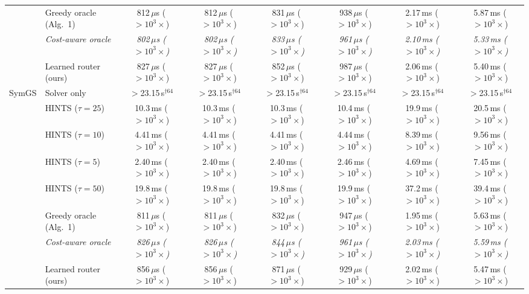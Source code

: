 {\begin{tabular}{llcccccc}
 & Greedy oracle (Alg.~1) & 812\,$\mu$s ($>10^{3}\times$) & 812\,$\mu$s ($>10^{3}\times$) & 831\,$\mu$s ($>10^{3}\times$) & 938\,$\mu$s ($>10^{3}\times$) & 2.17\,ms ($>10^{3}\times$) & 5.87\,ms ($>10^{3}\times$) \\
 & \textit{Cost-aware oracle} & \textit{802\,$\mu$s ($>10^{3}\times$)} & \textit{802\,$\mu$s ($>10^{3}\times$)} & \textit{833\,$\mu$s ($>10^{3}\times$)} & \textit{961\,$\mu$s ($>10^{3}\times$)} & \textit{2.10\,ms ($>10^{3}\times$)} & \textit{5.33\,ms ($>10^{3}\times$)} \\
 & Learned router (ours) & 827\,$\mu$s ($>10^{3}\times$) & 827\,$\mu$s ($>10^{3}\times$) & 852\,$\mu$s ($>10^{3}\times$) & 987\,$\mu$s ($>10^{3}\times$) & 2.06\,ms ($>10^{3}\times$) & 5.40\,ms ($>10^{3}\times$) \\
\midrule
SymGS & Solver only & $>$23.15\,s$^{\dagger 64}$ & $>$23.15\,s$^{\dagger 64}$ & $>$23.15\,s$^{\dagger 64}$ & $>$23.15\,s$^{\dagger 64}$ & $>$23.15\,s$^{\dagger 64}$ & $>$23.15\,s$^{\dagger 64}$ \\
 & HINTS ($\tau{=}25$) & 10.3\,ms ($>10^{3}\times$) & 10.3\,ms ($>10^{3}\times$) & 10.3\,ms ($>10^{3}\times$) & 10.4\,ms ($>10^{3}\times$) & 19.9\,ms ($>10^{3}\times$) & 20.5\,ms ($>10^{3}\times$) \\
 & HINTS ($\tau{=}10$) & 4.41\,ms ($>10^{3}\times$) & 4.41\,ms ($>10^{3}\times$) & 4.41\,ms ($>10^{3}\times$) & 4.44\,ms ($>10^{3}\times$) & 8.39\,ms ($>10^{3}\times$) & 9.56\,ms ($>10^{3}\times$) \\
 & HINTS ($\tau{=}5$) & 2.40\,ms ($>10^{3}\times$) & 2.40\,ms ($>10^{3}\times$) & 2.40\,ms ($>10^{3}\times$) & 2.46\,ms ($>10^{3}\times$) & 4.69\,ms ($>10^{3}\times$) & 7.45\,ms ($>10^{3}\times$) \\
 & HINTS ($\tau{=}50$) & 19.8\,ms ($>10^{3}\times$) & 19.8\,ms ($>10^{3}\times$) & 19.8\,ms ($>10^{3}\times$) & 19.9\,ms ($>10^{3}\times$) & 37.2\,ms ($>10^{3}\times$) & 39.4\,ms ($>10^{3}\times$) \\
 & Greedy oracle (Alg.~1) & 811\,$\mu$s ($>10^{3}\times$) & 811\,$\mu$s ($>10^{3}\times$) & 832\,$\mu$s ($>10^{3}\times$) & 947\,$\mu$s ($>10^{3}\times$) & 1.95\,ms ($>10^{3}\times$) & 5.63\,ms ($>10^{3}\times$) \\
 & \textit{Cost-aware oracle} & \textit{826\,$\mu$s ($>10^{3}\times$)} & \textit{826\,$\mu$s ($>10^{3}\times$)} & \textit{844\,$\mu$s ($>10^{3}\times$)} & \textit{961\,$\mu$s ($>10^{3}\times$)} & \textit{2.03\,ms ($>10^{3}\times$)} & \textit{5.59\,ms ($>10^{3}\times$)} \\
 & Learned router (ours) & 856\,$\mu$s ($>10^{3}\times$) & 856\,$\mu$s ($>10^{3}\times$) & 871\,$\mu$s ($>10^{3}\times$) & 929\,$\mu$s ($>10^{3}\times$) & 2.02\,ms ($>10^{3}\times$) & 5.47\,ms ($>10^{3}\times$) \\

\end{tabular}}
